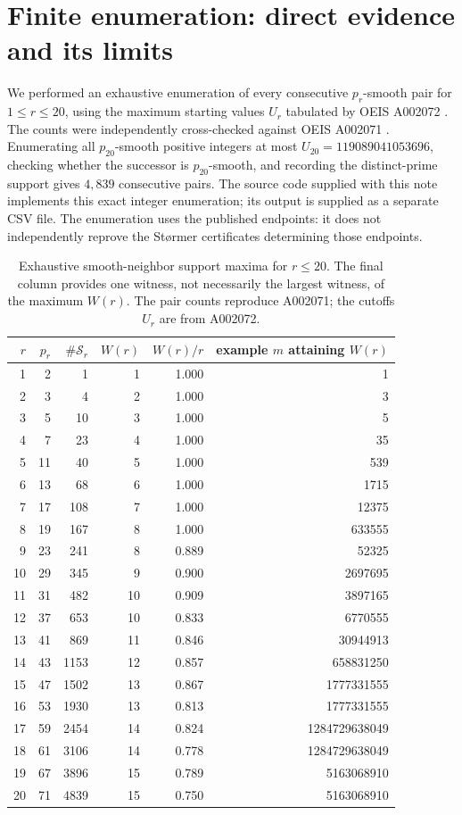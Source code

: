 \documentclass[11pt,letterpaper]{article}
\theoremstyle{remark}
\begin{document}
\section{Finite enumeration: direct evidence and its limits}
We performed an exhaustive enumeration of every consecutive
$p_r$-smooth pair for $1\le r\le20$, using the maximum starting
values $U_r$ tabulated by OEIS A002072 \cite{A002072}.
The counts were independently cross-checked against OEIS A002071
\cite{A002071}. Enumerating all $p_{20}$-smooth positive integers at
most $U_{20}=119089041053696$, checking whether the successor is
$p_{20}$-smooth, and recording the distinct-prime support gives
$4,839$ consecutive pairs. The source code supplied with this note
implements this exact integer enumeration; its output is supplied
as a separate CSV file. The enumeration uses the published endpoints:
it does not independently reprove the St\o rmer certificates determining
those endpoints.

\begin{table}[htbp]
\centering
\small
\begin{tabular}{@{}rrrrrr@{}}
\toprule
$r$ & $p_r$ & $\#\mathcal S_r$ & $W(r)$ & $W(r)/r$ & example $m$ attaining $W(r)$\\
\midrule
1&2&1&1&1.000&1\\
2&3&4&2&1.000&3\\
3&5&10&3&1.000&5\\
4&7&23&4&1.000&35\\
5&11&40&5&1.000&539\\
6&13&68&6&1.000&1715\\
7&17&108&7&1.000&12375\\
8&19&167&8&1.000&633555\\
9&23&241&8&0.889&52325\\
10&29&345&9&0.900&2697695\\
11&31&482&10&0.909&3897165\\
12&37&653&10&0.833&6770555\\
13&41&869&11&0.846&30944913\\
14&43&1153&12&0.857&658831250\\
15&47&1502&13&0.867&1777331555\\
16&53&1930&13&0.813&1777331555\\
17&59&2454&14&0.824&1284729638049\\
18&61&3106&14&0.778&1284729638049\\
19&67&3896&15&0.789&5163068910\\
20&71&4839&15&0.750&5163068910\\
\bottomrule
\end{tabular}
\caption{Exhaustive smooth-neighbor support maxima for $r\le20$.
The final column provides one witness, not necessarily the
largest witness, of the maximum $W(r)$. The pair counts reproduce
A002071; the cutoffs $U_r$ are from A002072.}
\label{tab:data}
\end{table}
\end{document}
